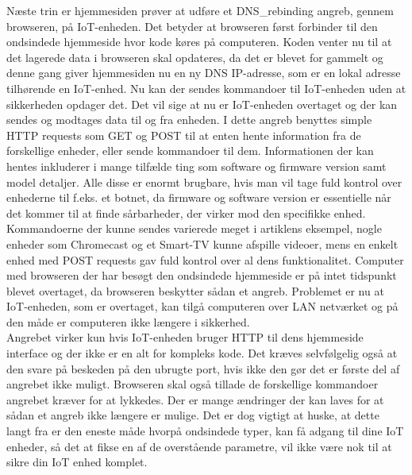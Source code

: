 Næste trin er hjemmesiden prøver at udføre et \Gls{DNS_rebinding} angreb, gennem browseren, på IoT-enheden. Det betyder at browseren først forbinder til den ondsindede hjemmeside hvor kode køres på computeren. Koden venter nu til at det lagerede data i browseren skal opdateres, da det er blevet for gammelt og denne gang giver hjemmesiden nu en ny DNS IP-adresse, som er en lokal adresse tilhørende en IoT-enhed. Nu kan der sendes kommandoer til IoT-enheden uden at sikkerheden opdager det. Det vil sige at nu er IoT-enheden overtaget og der kan sendes og modtages data til og fra enheden. I dette angreb benyttes simple HTTP requests som \Gls{GET} og \Gls{POST} til at enten hente information fra de forskellige enheder, eller sende kommandoer til dem. Informationen der kan hentes inkluderer i mange tilfælde ting som software og firmware version samt model detaljer. Alle disse er enormt brugbare, hvis man vil tage fuld kontrol over enhederne til f.eks. et \gls{botnet}, da firmware og software version er essentielle når det kommer til at finde sårbarheder, der virker mod den specifikke enhed. Kommandoerne der kunne sendes varierede meget i artiklens eksempel, nogle enheder som Chromecast og et Smart-TV kunne afspille videoer, mens en enkelt enhed med \Gls{POST} requests gav fuld kontrol over al dens funktionalitet.
Computer med browseren der har besøgt den ondsindede hjemmeside er på intet tidspunkt blevet overtaget, da browseren beskytter sådan et angreb. Problemet er nu at IoT-enheden, som er overtaget, kan tilgå computeren over LAN netværket og på den måde er computeren ikke længere i sikkerhed.
\\
Angrebet virker kun hvis IoT-enheden bruger HTTP til dens hjemmeside interface og der ikke er en alt for kompleks kode. Det kræves selvfølgelig også at den svare på beskeden på den ubrugte port, hvis ikke den gør det er første del af angrebet ikke muligt. Browseren skal også tillade de forskellige kommandoer angrebet kræver for at lykkedes. Der er mange ændringer der kan laves for at sådan et angreb ikke længere er mulige. Det er dog vigtigt at huske, at dette langt fra er den eneste måde hvorpå ondsindede typer, kan få adgang til dine IoT enheder, så det at fikse en af de overstående parametre, vil ikke være nok til at sikre din IoT enhed komplet.
\\